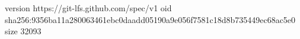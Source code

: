 version https://git-lfs.github.com/spec/v1
oid sha256:9356ba11a280063461ebc0daadd05190a9e056f7581c18d8b735449ec68ac5e0
size 32093
